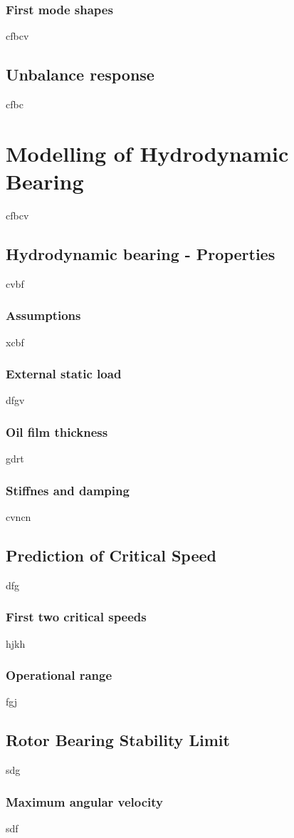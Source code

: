 \subsubsection{First mode shapes}
cfbcv
\subsection{Unbalance response}
cfbc
\section{Modelling of Hydrodynamic Bearing}
cfbcv
\subsection{Hydrodynamic bearing - Properties}
cvbf
\subsubsection{Assumptions}
xcbf
\subsubsection{External static load}
dfgv
\subsubsection{Oil film thickness}
gdrt
\subsubsection{Stiffnes and damping}
cvncn
\subsection{Prediction of Critical Speed}
dfg
\subsubsection{First two critical speeds}
hjkh
\subsubsection{Operational range}
fgj
\subsection{Rotor Bearing Stability Limit}
sdg
\subsubsection{Maximum angular velocity}
sdf
